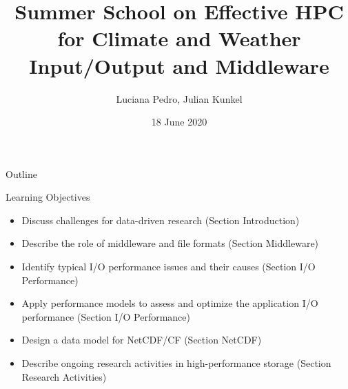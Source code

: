 \documentclass[compress,11pt,xcolor=svgnames,aspectratio=169]{beamer}
\title[Summer School -- Input/Output and Middleware]{Summer School on Effective HPC for Climate and Weather \\[0.5cm] Input/Output and Middleware}
\author[Pedro, Kunkel]{Luciana Pedro, Julian Kunkel
}
\institute[WP4 Team]{Department of Computer Science, University of Reading}
\date{18 June 2020}
\begin{document}
\begin{frame}[plain]
    \titlepage
\end{frame}

\begin{withoutheadline}
\begin{frame}{Outline}
    \begin{centering}
    \tableofcontents[hideallsubsections]
    \end{centering}

    \disclaimer
\end{frame}
\end{withoutheadline}


\begin{frame}[t]{Learning Objectives}

\begin{itemize}
\setlength\itemsep{0.4cm}
  \item Discuss challenges for data-driven research (Section Introduction)
  \item Describe the role of middleware and file formats (Section Middleware)
  \item Identify typical I/O performance issues and their causes (Section I/O Performance)
  \item Apply performance models to assess and optimize the application I/O performance (Section I/O Performance)
  \item Design a data model for NetCDF/CF (Section NetCDF)
  \item Describe ongoing research activities in high-performance storage (Section Research Activities)
\end{itemize}

\end{frame}
\end{document}
